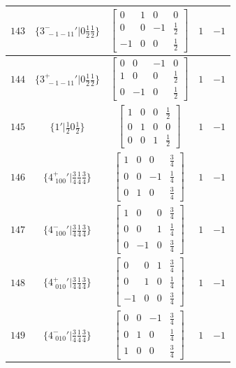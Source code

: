 \documentclass[fleqn,8pt]{jsarticle}
\begin{document}
\begin{longtable}{ccccc}
$ 143 $ & $ \{3^{-}_{\,\,-1-11}{}'|0 \frac{1}{2} \frac{1}{2}\} $ & $ \begin{bmatrix} 0 & 1 & 0 & 0 \\ 0 & 0 & -1 & \frac{1}{2} \\ -1 & 0 & 0 & \frac{1}{2} \end{bmatrix} $ & $ 1 $ & $ -1 $ \\ \hline
$ 144 $ & $ \{3^{+}_{\,\,-1-11}{}'|0 \frac{1}{2} \frac{1}{2}\} $ & $ \begin{bmatrix} 0 & 0 & -1 & 0 \\ 1 & 0 & 0 & \frac{1}{2} \\ 0 & -1 & 0 & \frac{1}{2} \end{bmatrix} $ & $ 1 $ & $ -1 $ \\ \hline
$ 145 $ & $ \{1{}'|\frac{1}{2} 0 \frac{1}{2}\} $ & $ \begin{bmatrix} 1 & 0 & 0 & \frac{1}{2} \\ 0 & 1 & 0 & 0 \\ 0 & 0 & 1 & \frac{1}{2} \end{bmatrix} $ & $ 1 $ & $ -1 $ \\ \hline
$ 146 $ & $ \{4^{+}_{\,\,100}{}'|\frac{3}{4} \frac{1}{4} \frac{3}{4}\} $ & $ \begin{bmatrix} 1 & 0 & 0 & \frac{3}{4} \\ 0 & 0 & -1 & \frac{1}{4} \\ 0 & 1 & 0 & \frac{3}{4} \end{bmatrix} $ & $ 1 $ & $ -1 $ \\ \hline
$ 147 $ & $ \{4^{-}_{\,\,100}{}'|\frac{3}{4} \frac{1}{4} \frac{3}{4}\} $ & $ \begin{bmatrix} 1 & 0 & 0 & \frac{3}{4} \\ 0 & 0 & 1 & \frac{1}{4} \\ 0 & -1 & 0 & \frac{3}{4} \end{bmatrix} $ & $ 1 $ & $ -1 $ \\ \hline
$ 148 $ & $ \{4^{+}_{\,\,010}{}'|\frac{3}{4} \frac{1}{4} \frac{3}{4}\} $ & $ \begin{bmatrix} 0 & 0 & 1 & \frac{3}{4} \\ 0 & 1 & 0 & \frac{1}{4} \\ -1 & 0 & 0 & \frac{3}{4} \end{bmatrix} $ & $ 1 $ & $ -1 $ \\ \hline
$ 149 $ & $ \{4^{-}_{\,\,010}{}'|\frac{3}{4} \frac{1}{4} \frac{3}{4}\} $ & $ \begin{bmatrix} 0 & 0 & -1 & \frac{3}{4} \\ 0 & 1 & 0 & \frac{1}{4} \\ 1 & 0 & 0 & \frac{3}{4} \end{bmatrix} $ & $ 1 $ & $ -1 $ \\ \hline

\end{longtable}
\end{document}
